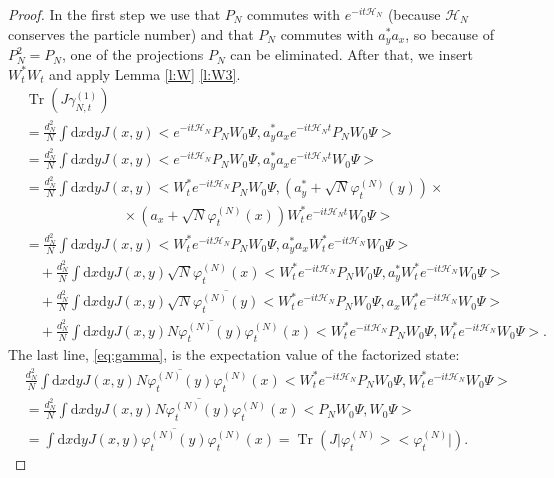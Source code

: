 \documentclass[11pt,a4paper,draft,DIV11]{scrartcl}	%
\newcommand{\di}{\textrm{d}}		%
\newcommand{\Hcal}{\mathcal{H}}		%
\newcommand{\scal}[2]{\big<#1,#2\big>} %
\newcommand{\cc}[1]{\overline{#1}}	%
\newcommand{\ph}{\varphi_t^{(N)}}	%
\newcommand{\project}[1]{\lvert #1 \big>\big< #1\rvert}	%
\newcommand{\Tr}{\operatorname{Tr}}	%
\begin{document}
\begin{proof}
In the first step we use that $P_N$ commutes with $e^{-it \Hcal_N}$ (because $\Hcal_N$ conserves the particle number) and that $P_N$ commutes with $a^\ast_y a_x$, so because of $P_N^2 = P_N$, one of the projections $P_N$ can be eliminated. After that, we insert $W^\ast_t W_t$ and apply Lemma \ref{l:W} \ref{l:W3}.
\begin{align}
& \Tr\left(J\gamma_{N,t}^{(1)}\right) \nonumber\\
& = \frac{d_N^2}{N} \int \di x\di y J(x,y) \scal{e^{-it\Hcal_N}P_N W_0 \Psi}{ a^\ast_y a_x e^{-it\Hcal_N t}P_N W_0 \Psi} \nonumber\\
& = \frac{d_N^2}{N} \int \di x\di y J(x,y) \scal{e^{-it\Hcal_N}P_N W_0 \Psi}{ a^\ast_y a_x e^{-it\Hcal_N t}W_0 \Psi} \nonumber\\
& = \frac{d_N^2}{N} \int \di x\di y J(x,y) \scal{W^\ast_t e^{-it\Hcal_N}P_N W_0 \Psi}{\left(a^\ast_y + \sqrt{N} \ph(y) \right) \times \nonumber\\
& \qquad\qquad\qquad\quad \times \left(a_x + \sqrt{N} \ph(x) \right) W^\ast_t e^{-it\Hcal_N t}W_0 \Psi} \nonumber\\
& = \frac{d_N^2}{N} \int \di x\di y J(x,y) \scal{W^\ast_t e^{-it\Hcal_N}P_N W_0 \Psi}{a^\ast_y a_x W^\ast_t e^{-it \Hcal_N} W_0 \Psi} \label{eq:quad}\\
& \quad + \frac{d_N^2}{N} \int \di x\di y J(x,y) \sqrt{N} \ph(x) \scal{W^\ast_t e^{-it\Hcal_N} P_N W_0 \Psi}{a^\ast_y W^\ast_t e^{-it \Hcal_N} W_0 \Psi} \label{eq:lin1} \\
& \quad + \frac{d_N^2}{N} \int \di x\di y J(x,y) \sqrt{N} \cc{\ph(y)} \scal{W^\ast_t e^{-it\Hcal_N}P_N W_0 \Psi}{a_x W^\ast_t e^{-it\Hcal_N} W_0 \Psi} \label{eq:lin2} \\
& \quad + \frac{d_N^2}{N} \int \di x\di y J(x,y) N \cc{\ph(y)}\ph(x) \scal{W^\ast_t e^{-it\Hcal_N} P_N W_0 \Psi}{W^\ast_t e^{-it\Hcal_N} W_0 \Psi}. \label{eq:gamma}
\end{align}
The last line, \eqref{eq:gamma}, is the expectation value of the factorized state:
\begin{align*}
& \frac{d_N^2}{N} \int \di x\di y J(x,y) N \cc{\ph(y)}\ph(x) \scal{W^\ast_t e^{-it\Hcal_N} P_N W_0 \Psi}{W^\ast_t e^{-it\Hcal_N} W_0 \Psi} \\
& = \frac{d_N^2}{N} \int \di x\di y J(x,y) N \cc{\ph(y)}\ph(x) \scal{P_N W_0 \Psi}{W_0 \Psi} \\
& = \int \di x\di y J(x,y) \cc{\ph(y)} \ph(x) = \Tr\left( J\project{\ph} \right).
\end{align*}

\end{proof}
\end{document}
